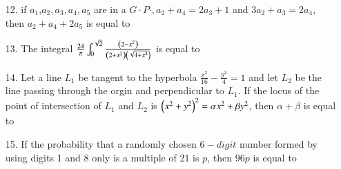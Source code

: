 \documentclass[journal,12pt,onecolumn]{IEEEtran}
\theoremstyle{remark}
\begin{document}
\begin{enumerate}
\item[12.] if $a_1$,$a_2,a_3,a_4,a_5$ are in a $G\cdot P\cdot ,a_2+a_4=2a_3+1$ and $3a_2+a_3=2a_4$, then $a_2+a_4+2a_5$ is equal to 
\item[13.] The integral $\frac{24}{\pi}\int_{0}^{\sqrt{2}}\frac{\left(2-x^2\right)}{\left(2+x^2\right)\left(\sqrt{4+x^4}\right)}$ is equal to 
\item[14.] Let a line $L_1$ be tangent to the hyperbola $\frac{x^2}{16}-\frac{y^2}{4}=1$ and let $L_2$ be the line passing through the orgin and perpendicular to $L_1$. If the locus of the point of intersection of $L_1$ and $L_2$ is $\left(x^2+y^2\right)^2=\alpha x^2+\beta y^2$, then $\alpha + \beta $ is equal to 
\item[15.] If the probability that a randomly chosen $6-digit$ number formed by using digits 1 and 8 only is a multiple of 21 is $p$, then $96 p$ is equal to 
\end{enumerate}
\end{document}
